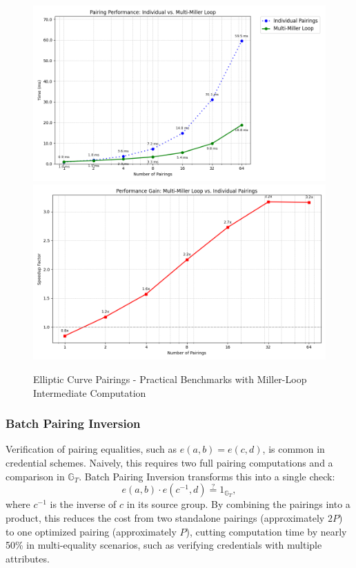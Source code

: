 \begin{figure}
    \centering
    \includegraphics[width=0.75\linewidth]{pairing_comparison.png}
        \includegraphics[width=0.75\linewidth]{pairing_comparison2.png}
    \caption{Elliptic Curve Pairings - Practical Benchmarks with Miller-Loop Intermediate Computation}
    \label{fig:elliptic_curve_pairings_speedup}
\end{figure}



\subsubsection*{Batch Pairing Inversion}
Verification of pairing equalities, such as $e(a, b) = e(c, d)$, is common in credential schemes. Naively, this requires two full pairing computations and a comparison in $\mathbb{G}_T$. Batch Pairing Inversion transforms this into a single check:
\[
e(a, b) \cdot e(c^{-1}, d) \stackrel{?}{=} 1_{\mathbb{G}_T},
\]
where $c^{-1}$ is the inverse of $c$ in its source group. By combining the pairings into a product, this reduces the cost from two standalone pairings (approximately $2P$) to one optimized pairing (approximately $P$), cutting computation time by nearly 50\% in multi-equality scenarios, such as verifying credentials with multiple attributes.

